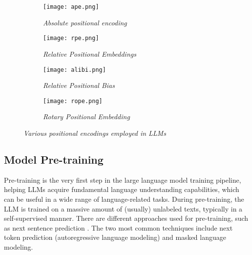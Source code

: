 \begin{figure}[H]
    \centering

    \begin{subfigure}[b]{.49\linewidth}
        \centering
        \texttt{[image: ape.png]}
        \caption{
            \it{Absolute positional encoding \cite{ke2021rethinking}}
        }
    \end{subfigure}
    \hfill
    \begin{subfigure}[b]{.49\linewidth}
        \centering
        \texttt{[image: rpe.png]}
        \caption{
            \it{Relative Positional Embeddings}
        }
    \end{subfigure}
    \par\bigskip
    \begin{subfigure}[b]{.49\linewidth}
        \centering
        \texttt{[image: alibi.png]}
        \caption{
            \it{Relative Positional Bias \cite{press2022train}}
        }
    \end{subfigure}
    \hfill
    \begin{subfigure}[b]{.49\linewidth}
        \centering
        \texttt{[image: rope.png]}
        \caption{
            \it{Rotary Positional Embedding \cite{su2023roformer}}
        }
    \end{subfigure}

    \caption{\it{Various positional encodings employed in LLMs}}

\end{figure}

\subsection{Model Pre-training}

Pre-training is the very first step in the large language model training pipeline, helping LLMs acquire fundamental language understanding capabilities, which can be useful in a wide range of language-related tasks. During pre-training, the LLM is trained on a massive amount of (usually) unlabeled texts, typically in a self-supervised manner. There are different approaches used for pre-training, such as next sentence prediction \cite{devlin2019bert}. The two most common techniques include next token prediction (autoregressive language modeling) and masked language modeling.

